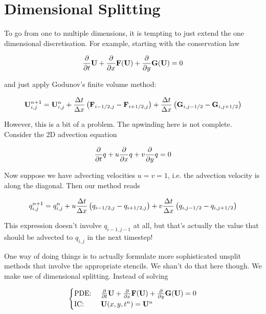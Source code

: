 \newpage
\section{Dimensional Splitting}


To go from one to multiple dimensions, it is tempting to just extend the one dimensional discretisation.
For example, starting with the conservation law

\begin{equation}
	\frac{\partial}{\partial t}{\mathbf{U}} + \frac{\partial}{\partial x}{\mathbf{F}(\mathbf{U})} + \frac{\partial}{\partial y} \mathbf{G}(\mathbf{U}) = 0
\end{equation}


and just apply Godunov's finite volume method:

\begin{equation}
	\mathbf{U}_{i,j}^{n+1} = 
					\mathbf{U}_{i,j}^n 
					+ \frac{\Delta t}{\Delta x} \left( \mathbf{F}_{i - 1/2, j} - \mathbf{F}_{i + 1/2, j}\right) 
					+ \frac{\Delta t}{\Delta x} \left( \mathbf{G}_{i ,j - 1/2} - \mathbf{G}_{i, j + 1/2}\right) 
\end{equation}


However, this is a bit of a problem.
The upwinding here is not complete.
Consider the 2D advection equation

\begin{equation}
	\frac{\partial}{\partial t}{q} + u\frac{\partial}{\partial x}{q} + v \frac{\partial}{\partial y} q = 0
\end{equation}

Now suppose we have advecting velocities $u = v = 1$, i.e. the advection velocity is along the diagonal.
Then our method reads 

\begin{equation}
	q_{i,j}^{n+1} = 
					q_{i,j}^n 
					+ u \frac{\Delta t}{\Delta x} \left( q_{i - 1/2, j} - q_{i + 1/2, j}\right) 
					+ v \frac{\Delta t}{\Delta x} \left( q_{i ,j - 1/2} - q_{i, j + 1/2}\right) 
\end{equation}

This expression doesn't involve $q_{i-1, j-1}$ at all, but that's actually the value that should be advected to $q_{i, j}$ in the next timestep!


One way of doing things is to actually formulate more sophisticated unsplit methods that involve the appropriate stencils.
We shan't do that here though.
We make use of dimensional splitting. 
Instead of solving

\begin{equation}
	\begin{cases}
		\text{PDE: } & \frac{\partial}{\partial t}{\mathbf{U}} + \frac{\partial}{\partial x}{\mathbf{F}(\mathbf{U})} + \frac{\partial}{\partial y} \mathbf{G}(\mathbf{U}) = 0\\
		\text{IC: } & \mathbf{U}(x, y, t^n) = \mathbf{U}^n
	\end{cases}
\end{equation}

